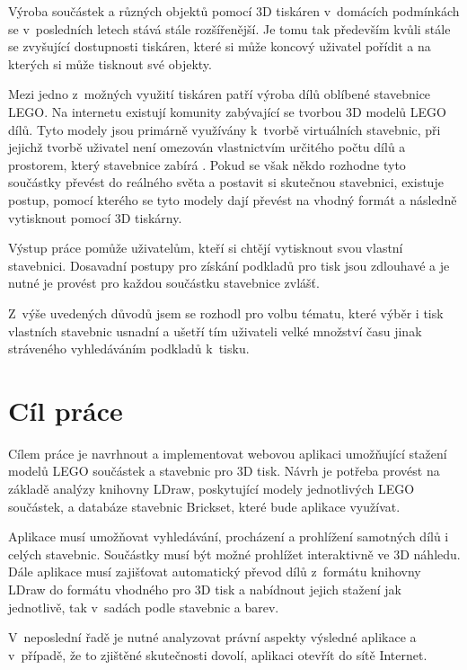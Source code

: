 \label{introduction}
Výroba součástek a různých objektů pomocí 3D tiskáren v~domácích podmínkách se v~posledních letech stává stále rozšířenější. Je tomu tak především kvůli stále se zvyšující dostupnosti tiskáren, které si může koncový uživatel pořídit a na kterých si může tisknout své objekty. 

Mezi jedno z~možných využití tiskáren patří výroba dílů oblíbené stavebnice LEGO. Na internetu existují komunity zabývající se tvorbou 3D modelů LEGO dílů. Tyto modely jsou primárně využívány k~tvorbě virtuálních stavebnic, při jejichž tvorbě uživatel není omezován vlastnictvím určitého počtu dílů a prostorem, který stavebnice zabírá \autocite{ldraw:homepage}. Pokud se však někdo rozhodne tyto součástky převést do reálného světa a postavit si skutečnou stavebnici, existuje postup, pomocí kterého se tyto modely dají převést na vhodný formát a následně vytisknout pomocí 3D tiskárny.

Výstup práce pomůže uživatelům, kteří si chtějí vytisknout svou vlastní stavebnici. Dosavadní postupy pro získání podkladů pro tisk jsou zdlouhavé a je nutné je provést pro každou součástku stavebnice zvlášť.

Z~výše uvedených důvodů jsem se rozhodl pro volbu tématu, které výběr i tisk vlastních stavebnic usnadní a ušetří tím uživateli velké množství času jinak stráveného vyhledáváním podkladů k~tisku. 

\section*{Cíl práce}
Cílem práce je navrhnout a implementovat webovou aplikaci umožňující stažení modelů LEGO součástek a stavebnic pro 3D tisk. Návrh je potřeba provést na základě analýzy knihovny LDraw, poskytující modely jednotlivých LEGO součástek, a databáze stavebnic Brickset, které bude aplikace využívat.

Aplikace musí umožňovat vyhledávání, procházení a prohlížení samotných dílů i celých stavebnic. Součástky musí být možné prohlížet interaktivně ve 3D náhledu. Dále aplikace musí zajišťovat automatický převod dílů z~formátu knihovny LDraw do formátu vhodného pro 3D tisk a nabídnout jejich stažení jak jednotlivě, tak v~sadách podle stavebnic a barev. 

V~neposlední řadě je nutné analyzovat právní aspekty výsledné aplikace a v~případě, že to zjištěné skutečnosti dovolí, aplikaci otevřít do sítě Internet.
